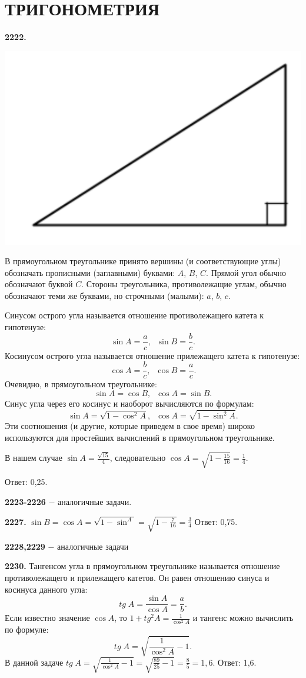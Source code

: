 \section{ТРИГОНОМЕТРИЯ}

\textbf{2222.}

{\centering \includegraphics[width=0.35\linewidth]{Geometry/Content/51.png}
	
}

В прямоугольном треугольнике принято вершины (и соответствующие углы) обозначать прописными (заглавными) буквами: $A$, $B$, $C$. Прямой угол обычно обозначают буквой $C$. Стороны треугольника, противолежащие углам, обычно обозначают теми же буквами, но строчными (малыми): $a$, $b$, $c$.

Синусом острого угла называется отношение противолежащего катета к гипотенузе:
\[
\sin{A} = \frac{a}{c}, \;\; \sin{B}=\frac{b}{c}.
\]
Косинусом острого угла называется отношение прилежащего катета к гипотенузе:
\[
\cos{A} = \frac{b}{c}, \;\; \cos{B}=\frac{a}{c}.
\]
Очевидно, в прямоугольном треугольнике:
\[
\sin{A} = \cos{B}, \;\; \cos{A} = \sin{B}.
\]
Синус угла через его косинус и наоборот вычисляются по формулам:
\[
\sin{A} = \sqrt{1-\cos^2{A}}, \;\; \cos{A} = \sqrt{1 - \sin^2{A}}.
\]
 Эти соотношения (и другие, которые приведем в свое время) широко используются для простейших вычислений в прямоугольном треугольнике.
 
 В нашем случае  $\sin{A} = \frac{\sqrt{15}}{4}$, следовательно $\cos{A}=\sqrt{1 - \frac{15}{16}}=\frac{1}{4}.$ 
 
 \null \hspace*{\fill} Ответ: 0,25.
 
 \textbf{2223-2226} $-$ аналогичные задачи.
 
 \textbf{2227.} $\sin{B} = \cos{A} = \sqrt{1-\sin^{A}}=\sqrt{1-\frac{7}{16}}=\frac{3}{4}$ \newline \null \hspace*{\fill} Ответ: 0,75.
 
 \textbf{2228,2229} $-$ аналогичные задачи
 
 \textbf{2230.} Тангенсом угла в прямоугольном треугольнике называется отношение противолежащего и прилежащего катетов. Он равен отношению синуса и косинуса данного угла:
 \[
 tg\;A = \frac{\sin{A}}{\cos{A}} = \frac{a}{b}.
 \]
 Если известно значение $\cos{A}$, то $1+tg^2A=\frac{1}{\cos^2{A}}$ и тангенс можно вычислить по формуле:
 \[
 tg\;A=\sqrt{\frac{1}{\cos^2{A}} - 1}.
 \]
 В данной задаче $tg\;A=\sqrt{\frac{1}{\cos^2{A}} - 1} = \sqrt{\frac{89}{25} - 1} = \frac{8}{5}=1,6$. \newline \null \hspace*{\fill} Ответ: 1,6.
 
